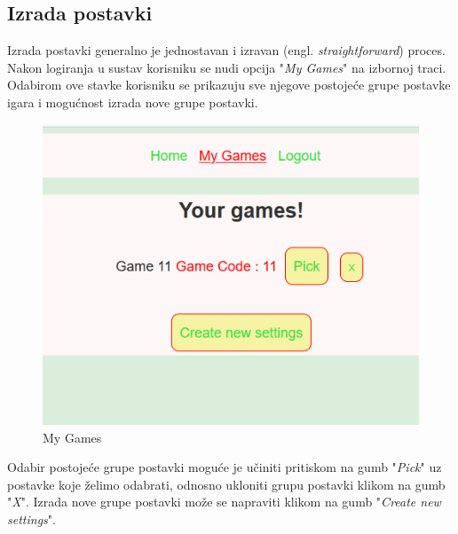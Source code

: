 \documentclass[times, utf8, zavrsni]{fer}
\begin{document}
	\subsection{Izrada postavki}
	Izrada postavki generalno je jednostavan i izravan (engl. \textit{straightforward}) proces. Nakon logiranja u sustav korisniku se nudi opcija "\textit{My Games}" na izbornoj traci. Odabirom ove stavke korisniku se prikazuju sve
	njegove postojeće grupe postavke igara i mogućnost izrada nove grupe postavki. 
	
		\begin{figure}[H]
			\includegraphics[scale = 0.7]{"slike/izradapostavki.png"} 
			\centering
			\caption{My Games}
			\label{fig:izradapostavki}
		\end{figure}
	
	Odabir postojeće grupe postavki moguće je učiniti pritiskom na gumb "\textit{Pick}" uz postavke koje želimo odabrati, odnosno ukloniti grupu postavki klikom na  gumb "\textit{X}". Izrada nove grupe postavki može se napraviti klikom na gumb
	 "\textit{Create new settings}". 
	 
\end{document}
